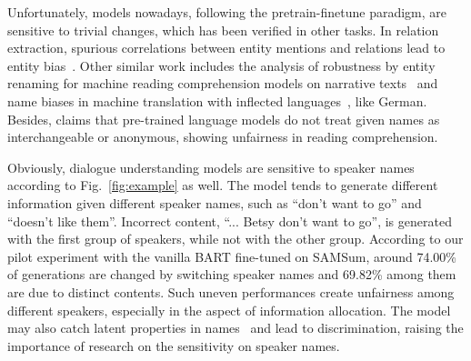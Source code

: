 Unfortunately, models nowadays, following the pretrain-finetune paradigm, 
are sensitive to trivial changes, which has been verified in other tasks. 
In relation extraction, spurious correlations between entity mentions and 
relations lead to entity bias~\cite{zhang2018graph,zhang-etal-2017-position,wang-etal-2022-rely}. 
Other similar work includes the analysis of robustness by entity 
renaming for machine reading comprehension models on narrative 
texts~\cite{yan2022robustness} and name biases in machine translation 
with inflected languages~\cite{wang2022measuring}, like German. 
Besides, \citet{shwartz2020you} claims that pre-trained language models do not treat given names as interchangeable or anonymous, showing unfairness in reading comprehension.%

Obviously, dialogue understanding models are sensitive to speaker names 
according to Fig.~\ref{fig:example} as well. 
The model tends to generate different information 
given different speaker names, such as ``don't want to go'' and 
``doesn't like them''.
Incorrect content, 
``... Betsy don't want to go'', is generated with the first group of speakers, 
while not with the other group. 
According to our pilot experiment with the vanilla BART fine-tuned on SAMSum, around 74.00\% of generations are changed by switching speaker names and 69.82\% among them are due to distinct contents.
Such uneven performances %
create unfairness among 
different speakers, especially in the aspect of information allocation. 
The model may also catch latent properties 
in names~\cite{romanov2019s} and lead to discrimination, %
raising the importance of research on the sensitivity on speaker names.


